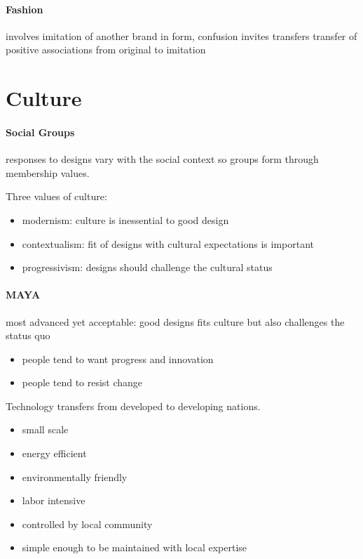 \documentclass{article}
\begin{document}
\paragraph{Fashion}
\label{par:fashion}
involves imitation of another brand in form, confusion invites transfers transfer of positive associations from original to imitation

\section*{Culture}
\label{sec:culture}
\paragraph{Social Groups}
\label{par:social_groups}
responses to designs vary with the social context so groups form through membership values.

Three values of culture:
\begin{itemize}
	\item modernism: culture is inessential to good design
	\item contextualism: fit of designs with cultural expectations is important
	\item progressivism: designs should challenge the cultural status
\end{itemize}

\paragraph{MAYA}
\label{par:maya}
most advanced yet acceptable: good designs fits culture but also challenges the status quo
\begin{itemize}
	\item people tend to want progress and innovation
	\item people tend to resist change
\end{itemize}

Technology transfers from developed to developing nations.
\begin{itemize}
	\item small scale
	\item energy efficient
	\item environmentally friendly
	\item labor intensive
	\item controlled by local community
	\item simple enough to be maintained with local expertise
\end{itemize}
\end{document}
